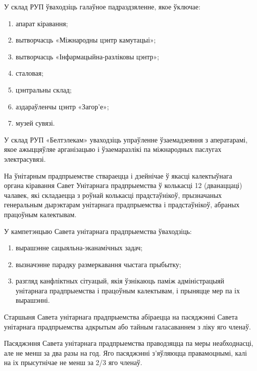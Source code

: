 У склад РУП ўваходзіць галаўное падраздзяленне, якое ўключае:
\begin{enumerate}
    \item апарат кіравання;
    \item вытворчасць «Міжнародны цэнтр камутацыі»;
    \item вытворчасць «Інфармацыйна-разліковы цэнтр»;
    \item сталовая;
    \item цэнтральны склад;
    \item аздараўленчы цэнтр «Загор'е»;
    \item музей сувязі.
\end{enumerate}

У склад РУП «Белтэлекам» уваходзіць упраўленне ўзаемадзеяння з аператарамі,
якое ажыццяўляе арганізацыю і ўзаемаразлікі па міжнародных паслугах электрасувязі.

На ўнітарным прадпрыемстве ствараецца і дзейнічае ў якасці калектыўнага органа кіравання
Савет Унітарнага прадпрыемства ў колькасці 12 (дванаццаці) чалавек,
які складаецца з роўнай колькасці прадстаўнікоў,
прызначаных генеральным дырэктарам унітарнага прадпрыемства і прадстаўнікоў, абраных працоўным калектывам.

У кампетэнцыю Савета унітарнага прадпрыемства ўваходзіць:
\begin{enumerate}
    \item вырашэнне сацыяльна-эканамічных задач;
    \item вызначэнне парадку размеркавання чыстага прыбытку;
    \item разгляд канфліктных сітуацый,
          якія ўзнікаюць паміж адміністрацыяй унітарнага прадпрыемства і працоўным калектывам,
          і прыняцце мер па іх вырашэнні.
\end{enumerate}

Старшыня Савета унітарнага прадпрыемства абіраецца на пасяджэнні
Савета унітарнага прадпрыемства адкрытым або тайным галасаваннем з ліку яго членаў.

Пасяджэння Савета унітарнага прадпрыемства праводзяцца па меры неабходнасці,
але не менш за два разы на год. Яго пасяджэнні з'яўляюцца правамоцнымі,
калі на іх прысутнічае не менш за 2/3 яго членаў.

